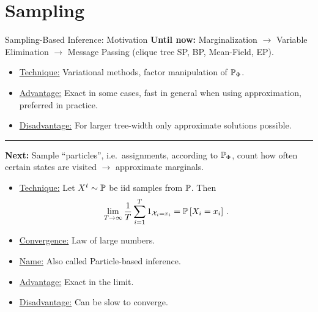 \section{Sampling}

\begin{frame}{Sampling-Based Inference: Motivation}
\textbf{Until now:} Marginalization $\rightarrow$ Variable Elimination $\rightarrow$ Message Passing (clique tree SP, BP, Mean-Field, EP).
\begin{itemize}
    \pause \item \underline{Technique:} Variational methods, factor manipulation of $\Pb_{\Phi}$.
    \pause \item \underline{Advantage:} Exact in some cases, fast in general when using approximation, preferred in practice.
    \pause \item \underline{Disadvantage:} For larger tree-width only approximate solutions possible.
\end{itemize}
\pause
\hrule
\textbf{Next:} Sample ``particles'', i.e.\ assignments, according to $\Pb_{\Phi}$, count how often certain states are visited $\rightarrow$ approximate marginals.
\\
\pause
\begin{itemize}
    \item \underline{Technique:} 
Let $X^t \sim \Pb$ be iid samples from $\Pb$. Then
\begin{equation}
    \lim_{T \rightarrow \infty} \frac{1}{T} \sum_{i=1}^T  1_{\mathcal{X}_i = x_i}  = \Pb[X_i = x_i]\,.
\end{equation}
    \pause \item \underline{Convergence:} \pause Law of large numbers.
    \pause \item \underline{Name:} Also called Particle-based inference.
    \pause \item \underline{Advantage:} Exact in the limit.
    \pause \item \underline{Disadvantage:} Can be slow to converge.
\end{itemize}
\end{frame}

